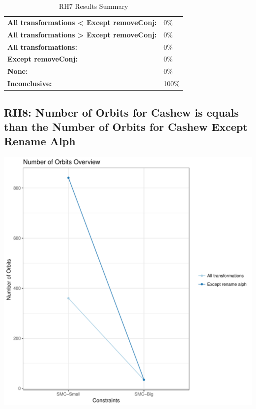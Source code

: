 \documentclass{article}\usepackage[]{graphicx}\usepackage[]{color}
\makeatletter
\def\maxwidth{ %
  \ifdim\Gin@nat@width>\linewidth
    \linewidth
  \else
    \Gin@nat@width
  \fi
}
\newenvironment{knitrout}{}{} %
\makeatother
\begin{document}
	\begin{table}[H]
	\centering
	\caption{RH7 Results Summary}
	\begin{tabular}{ll}
	\textbf{All transformations \textless{} Except removeConj:}& 0\% \\
	\textbf{All transformations \textgreater{} Except removeConj:}& 0\%\\
	\textbf{All transformations:} & 0\%\\
	\textbf{Except removeConj:} & 0\%\\
	\textbf{None:}& 0\%\\
	\textbf{Inconclusive:}& 100\%
			
	
	\end{tabular}
	\end{table}
	
	
	



\subsection{RH8: Number of Orbits for Cashew is equals than the Number of Orbits for Cashew Except Rename Alph}


 
\begin{knitrout}
\color{fgcolor}
\includegraphics[width=\maxwidth]{figure/overview_RH8-1} 

\end{knitrout}
 	
\end{document}
